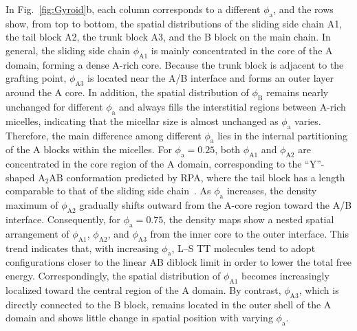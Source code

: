 In Fig.~\ref{fig:Gyroid}b, each column corresponds to a different $\phi_{\mathrm a}$, and the rows show, from top to bottom, the spatial distributions of the sliding side chain A1, the tail block A2, the trunk block A3, and the B block on the main chain.
In general, the sliding side chain $\phi_{\mathrm{A1}}$ is mainly concentrated in the core of the A domain, forming a dense A-rich core.
Because the trunk block is adjacent to the grafting point, $\phi_{\mathrm{A3}}$ is located near the A/B interface and forms an outer layer around the A core.
In addition, the spatial distribution of $\phi_{\mathrm B}$ remains nearly unchanged for different $\phi_{\mathrm a}$ and always fills the interstitial regions between A-rich micelles, indicating that the micellar size is almost unchanged as $\phi_{\mathrm a}$ varies.
Therefore, the main difference among different $\phi_{\mathrm a}$ lies in the internal partitioning of the A blocks within the micelles.
For $\phi_{\mathrm a}=0.25$, both $\phi_{\mathrm{A1}}$ and $\phi_{\mathrm{A2}}$ are concentrated in the core region of the A domain, corresponding to the ``Y''-shaped $\mathrm{A}_2\mathrm{AB}$ conformation predicted by RPA, where the tail block has a length comparable to that of the sliding side chain~\cite{Zhao2024Phase}.
As $\phi_{\mathrm a}$ increases, the density maximum of $\phi_{\mathrm{A2}}$ gradually shifts outward from the A-core region toward the A/B interface.
Consequently, for $\phi_{\mathrm a}=0.75$, the density maps show a nested spatial arrangement of $\phi_{\mathrm{A1}}$, $\phi_{\mathrm{A2}}$, and $\phi_{\mathrm{A3}}$ from the inner core to the outer interface.
This trend indicates that, with increasing $\phi_{\mathrm a}$, L--S TT molecules tend to adopt configurations closer to the linear AB diblock limit in order to lower the total free energy.
Correspondingly, the spatial distribution of $\phi_{\mathrm{A1}}$ becomes increasingly localized toward the central region of the A domain.
By contrast, $\phi_{\mathrm{A3}}$, which is directly connected to the B block, remains located in the outer shell of the A domain and shows little change in spatial position with varying $\phi_{\mathrm a}$.


